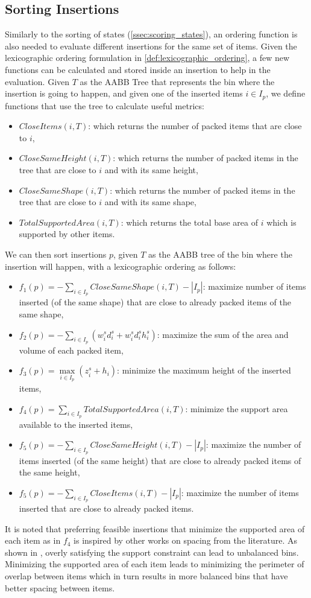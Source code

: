 \subsection{Sorting Insertions}
\label{ssec:scoring_insertions}%
Similarly to the sorting of states (\cref{ssec:scoring_states}), an ordering function is also needed to evaluate different insertions for the same set of items.
Given the lexicographic ordering formulation in \cref{def:lexicographic_ordering}, a few new functions can be calculated and stored inside an insertion to help in the evaluation.
Given $T$ as the AABB Tree that represents the bin where the insertion is going to happen, and given one of the inserted items $i \in I_p$, we define functions that use the tree to calculate useful metrics:
\begin{itemize}
    \item $CloseItems(i, T)$: which returns the number of packed items that are close to $i$,
    \item $CloseSameHeight(i, T)$: which returns the number of packed items in the tree that are close to $i$ and with its same height,
    \item $CloseSameShape(i, T)$: which returns the number of packed items in the tree that are close to $i$ and with its same shape,
    \item $TotalSupportedArea(i, T)$: which returns the total base area of $i$ which is supported by other items.
\end{itemize}
We can then sort insertions $p$, given $T$ as the AABB tree of the bin where the insertion will happen, with a lexicographic ordering as follows:
\begin{itemize}
    \item $f_1(p) = -\sum\limits_{i \in I_p}{CloseSameShape(i, T)} - |I_p|$: maximize number of items inserted (of the same shape) that are close to already packed items of the same shape,
    \item $f_2(p) = -\sum\limits_{i \in I_p}{(w^s_i d^s_i + w^s_i d^s_i h^s_i)}$: maximize the sum of the area and volume of each packed item,
    \item $f_3(p) = \max\limits_{i \in I_p}(z^s_i + h_i)$: minimize the maximum height of the inserted items,
    \item $f_4(p) = \sum\limits_{i \in I_p}{TotalSupportedArea(i, T)}$: minimize the support area available to the inserted items,
    \item $f_5(p) = -\sum\limits_{i \in I_p}{CloseSameHeight(i, T)} - |I_p|$: maximize the number of items inserted (of the same height) that are close to already packed items of the same height,
    \item $f_5(p) = -\sum\limits_{i \in I_p}{CloseItems(i, T)} - |I_p|$: maximize the number of items inserted that are close to already packed items.
\end{itemize}
It is noted that preferring feasible insertions that minimize the supported area of each item as in $f_4$ is inspired by other works on spacing from the literature.
As shown in \cite{elhedhli2019three}, overly satisfying the support constraint can lead to unbalanced bins.
Minimizing the supported area of each item leads to minimizing the perimeter of overlap between items which in turn results in more balanced bins that have better spacing between items.